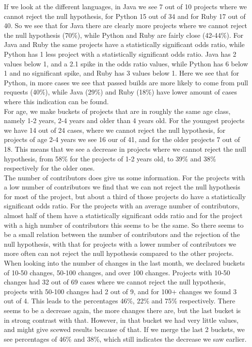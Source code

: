 \documentclass[a4paper,11pt]{article}
\begin{document}
			If we look at the different languages, in Java we see 7 out of 10 projects where we cannot reject the null hypothesis, for Python 15 out of 34 and for Ruby 17 out of 40. So we see that for Java there are clearly more projects where we cannot reject the null hypothesis (70\%), while Python and Ruby are fairly close (42-44\%). For Java and Ruby the same projects have a statistically significant odds ratio, while Python has 1 less project with a statistically significant odds ratio. Java has 2 values below 1, and a 2.1 spike in the odds ratio values, while Python has 6 below 1 and no significant spike, and Ruby has 3 values below 1. Here we see that for Python, in more cases we see that passed builds are more likely to come from pull requests (40\%), while Java (29\%) and Ruby (18\%) have lower amount of cases where this indication can be found. \\

			For age, we make buckets of projects that are in roughly the same age class, namely 1-2 years, 2-4 years and older than 4 years old. For the youngest projects we have 14 out of 24 cases, where we cannot reject the null hypothesis, for projects of age 2-4 years we see 16 our of 41, and for the older projects 7 out of 18. This means that we see a decrease in projects where we cannot reject the null hypothesis, from 58\% for the projects of 1-2 years old, to 39\% and 38\% respectively for the older ones. \\
			
			The number of contributors does give us some information.
			For the projects with a low number of contributors we find that we can not reject the null hypothesis for most of the
			project, but about a third of those projects do have a statistically significant odds ratio.
			For the projects with an average number of contributors, almost half of them have a statistically significant odds
			ratio and for the project with a high number of contributors this seems to be the same.
			So there seems to be a small relation between the number of contributors and the rejection of the null hypothesis,
			with that for projects with a lower number of contributors we more often can not reject the null hypothesis compared
			to the other projects. \\

			When looking into the number of changes in the last month, we declared buckets of 10-50 changes, 50-100 changes, and over 100 changes. Projects with 10-50 changes had 32 out of 69 cases where we cannot reject the null hypothesis, projects with 50-100 changes had 2 out of 9, and for 100+ changes we found 3 out of 4. This leads to the percentages 46\%, 22\% and 75\% respectively. There seems to be a decrease again, the more changes there are, but the last bucket is in strong contrast with that. However, in that bucket we had very little values, and might give scewed results because of that. If we merge the last 2 buckets, we see percentages of 46\% and 38\%, which still indicates the decrease we saw earlier. \\
\end{document}
